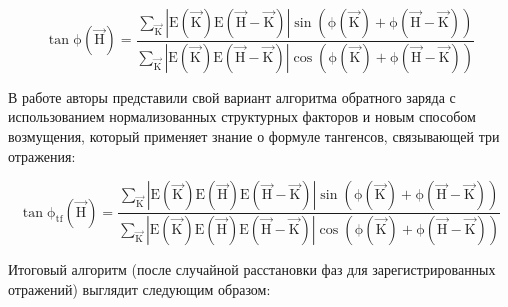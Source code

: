 \begin{equation}\label{sigma2}
	\mathrm{\tan\phi(\overrightarrow{H}) = \frac{\sum\limits_{\overrightarrow{K}}|E(\overrightarrow{K})E(\overrightarrow{H}-\overrightarrow{K})|\sin(\phi(\overrightarrow{K})+\phi(\overrightarrow{H}-\overrightarrow{K}))}{\sum\limits_{\overrightarrow{K}}|E(\overrightarrow{K})E(\overrightarrow{H}-\overrightarrow{K})|\cos(\phi(\overrightarrow{K})+\phi(\overrightarrow{H}-\overrightarrow{K}))}
	}
\end{equation}

В работе \cite{coelho_charge-flipping_2007} авторы представили свой вариант алгоритма обратного заряда с использованием нормализованных структурных факторов и новым способом возмущения, который применяет знание о формуле тангенсов, связывающей три отражения:

\begin{equation}\label{sigma3}
	\mathrm{\tan\phi_{tf}(\overrightarrow{H}) = \frac{\sum\limits_{\overrightarrow{K}}|E(\overrightarrow{K})E(\overrightarrow{H})E(\overrightarrow{H}-\overrightarrow{K})|\sin(\phi(\overrightarrow{K})+\phi(\overrightarrow{H}-\overrightarrow{K}))}{\sum\limits_{\overrightarrow{K}}|E(\overrightarrow{K})E(\overrightarrow{H})E(\overrightarrow{H}-\overrightarrow{K})|\cos(\phi(\overrightarrow{K})+\phi(\overrightarrow{H}-\overrightarrow{K}))}
	}
\end{equation}

Итоговый алгоритм (после случайной расстановки фаз для зарегистрированных отражений) выглядит следующим образом:

